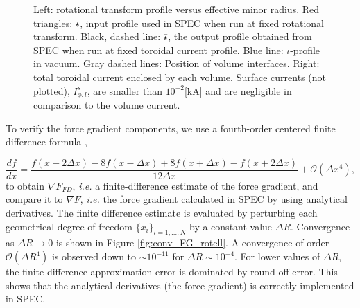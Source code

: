  
 \begin{figure}
     \centering
     \hfill
     \hfill
     \hfill
     \caption{Left: rotational transform profile versus effective minor radius. Red triangles: $\text{$\iota\!\!$-}$, input profile used in \ac{SPEC} when run at fixed rotational transform. Black, dashed line: $\bar{\text{$\iota\!\!$-}}$, the output profile obtained from \ac{SPEC} when run at fixed toroidal current profile. Blue line: $\iota$-profile in vacuum. Gray dashed lines: Position of volume interfaces. Right: total toroidal current enclosed by each volume. Surface currents (not plotted), $I^s_{\phi,l}$, are smaller than $10^{-2}$[kA] and are negligible in comparison to the volume current.}
     \label{fig:iota_and_current_profile}
 \end{figure}
 
 To verify the force gradient components, we use a fourth-order centered finite difference formula \citep{Fornberg1988},
 
 \begin{equation}
     \frac{d f}{d x} = \frac{f(x-2\Delta x)  - 8f(x-\Delta x) + 8f(x+\Delta x) - f(x+2\Delta x)}{12\Delta x} + \mathcal{O}(\Delta x^4),
 \end{equation}
 to obtain $\nabla F_{FD}$, \textit{i.e.} a finite-difference estimate of the force gradient, and compare it to $\nabla F$, \textit{i.e.} the force gradient calculated in \ac{SPEC} by using analytical derivatives. The finite difference estimate is evaluated by perturbing each geometrical degree of freedom $\{x_i\}_{l=1,\ldots,N}$ by a constant value $\Delta R$. Convergence as $\Delta R\rightarrow 0$ is shown in Figure \ref{fig:conv_FG_rotell}. A convergence of order $\mathcal{O}(\Delta R^4)$ is observed down to $\sim 10^{-11}$ for $\Delta R\sim 10^{-4}$. For lower values of $\Delta R$, the finite difference approximation error is dominated by round-off error. This shows that the analytical derivatives (the force gradient) is correctly implemented in \ac{SPEC}.
 
